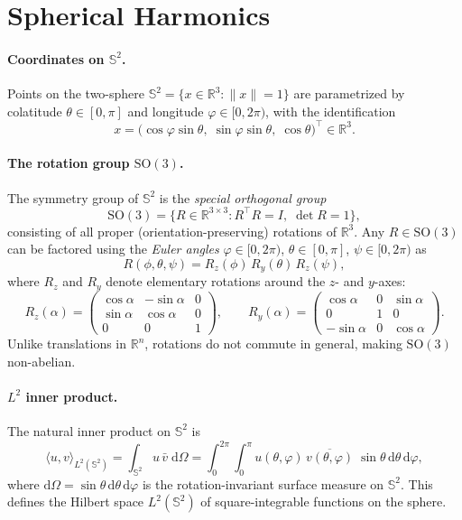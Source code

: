 \documentclass{article}
\theoremstyle{plain}
\theoremstyle{definition}
\theoremstyle{remark}
\renewcommand{\S}{\ensuremath{\mathbb{S}}}
\begin{document}
\section{Spherical Harmonics}\label{app:spherical-harmonics}
\paragraph{Coordinates on $\S^2$.}

Points on the two-sphere $\S^2 = \{x \in \mathbb{R}^3 : \|x\| = 1\}$ are parametrized by colatitude $\theta \in [0,\pi]$ and longitude $\varphi \in [0, 2\pi)$, with the identification
\[
x = \bigl(\cos\varphi\sin\theta,\; \sin\varphi\sin\theta,\; \cos\theta\bigr)^\top \in \mathbb{R}^3.
\]

\paragraph{The rotation group $\mathrm{SO}(3)$.}
The symmetry group of $\S^2$ is the \emph{special orthogonal group}
\[
\mathrm{SO}(3) = \bigl\{ R \in \mathbb{R}^{3\times 3} : R^\top R = I,\; \det R = 1 \bigr\},
\]
consisting of all proper (orientation-preserving) rotations of $\mathbb{R}^3$.
Any $R \in \mathrm{SO}(3)$ can be factored using the \emph{Euler angles} $\varphi \in [0,2\pi)$, $\theta \in [0,\pi]$, $\psi \in [0,2\pi)$ as
\[
R(\phi, \theta, \psi) = R_z(\phi)\, R_y(\theta)\, R_z(\psi),
\]
where $R_z$ and $R_y$ denote elementary rotations around the $z$- and $y$-axes:
\[
R_z(\alpha) =
\begin{pmatrix}
\cos\alpha & -\sin\alpha & 0 \\
\sin\alpha &  \cos\alpha & 0 \\
0 & 0 & 1
\end{pmatrix},
\qquad
R_y(\alpha) =
\begin{pmatrix}
 \cos\alpha & 0 & \sin\alpha \\
 0 & 1 & 0 \\
-\sin\alpha & 0 & \cos\alpha
\end{pmatrix}.
\]
Unlike translations in $\mathbb{R}^n$, rotations do not commute in general, making $\mathrm{SO}(3)$ non-abelian.

\paragraph{$L^2$ inner product.}
The natural inner product on $\S^2$ is
\[
\langle u, v \rangle_{L^2(\S^2)}
= \int_{\S^2} u\, \bar{v}\; \mathrm{d}\Omega
= \int_0^{2\pi}\!\int_0^{\pi}
  u(\theta,\varphi)\,\overline{v(\theta,\varphi)}\;\sin\theta\,\mathrm{d}\theta\,\mathrm{d}\varphi,
\]
where $\mathrm{d}\Omega = \sin\theta\,\mathrm{d}\theta\,\mathrm{d}\varphi$ is the rotation-invariant surface measure on $\S^2$.
This defines the Hilbert space $L^2(\S^2)$ of square-integrable functions on the sphere.
\end{document}
